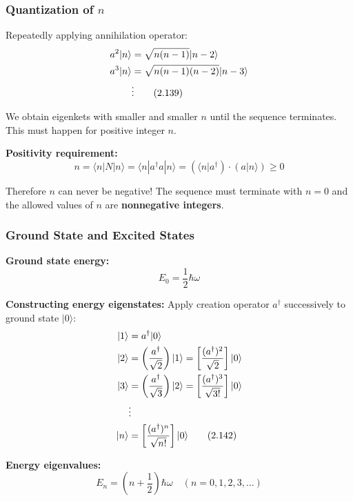 \documentclass[11pt,a4paper]{article}
\begin{document}
\subsubsection{Quantization of $n$}

Repeatedly applying annihilation operator:
\begin{align}
a^2|n\rangle &= \sqrt{n(n-1)}|n-2\rangle \notag \\
a^3|n\rangle &= \sqrt{n(n-1)(n-2)}|n-3\rangle \notag \\
&\vdots
\tag{2.139}
\end{align}

We obtain eigenkets with smaller and smaller $n$ until the sequence terminates. This must happen for positive integer $n$.

\textbf{Positivity requirement:}
\begin{equation}
n = \langle n|N|n\rangle = \langle n|a^\dagger a|n\rangle = (\langle n|a^\dagger) \cdot (a|n\rangle) \geq 0
\tag{2.140}
\end{equation}

Therefore $n$ can never be negative! The sequence must terminate with $n = 0$ and the allowed values of $n$ are \textbf{nonnegative integers}.

\subsubsection{Ground State and Excited States}

\textbf{Ground state energy:}
\begin{equation}
\boxed{E_0 = \frac{1}{2}\hbar\omega}
\tag{2.141}
\end{equation}

\textbf{Constructing energy eigenstates:}
Apply creation operator $a^\dagger$ successively to ground state $|0\rangle$:
\begin{align}
|1\rangle &= a^\dagger|0\rangle \notag \\
|2\rangle &= \left(\frac{a^\dagger}{\sqrt{2}}\right)|1\rangle = \left[\frac{(a^\dagger)^2}{\sqrt{2}}\right]|0\rangle \notag \\
|3\rangle &= \left(\frac{a^\dagger}{\sqrt{3}}\right)|2\rangle = \left[\frac{(a^\dagger)^3}{\sqrt{3!}}\right]|0\rangle \notag \\
&\vdots \notag \\
|n\rangle &= \left[\frac{(a^\dagger)^n}{\sqrt{n!}}\right]|0\rangle
\tag{2.142}
\end{align}

\textbf{Energy eigenvalues:}
\begin{equation}
\boxed{E_n = \left(n + \frac{1}{2}\right)\hbar\omega \quad (n = 0,1,2,3,\ldots)}
\tag{2.143}
\end{equation}
\end{document}
